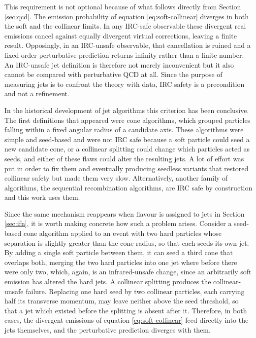 This requirement is not optional because of what follows directly from Section \ref{sec:qcd}.
The emission probability of equation \eqref{eq:soft-collinear}
diverges in both the soft and the collinear limits. In any IRC-safe observable
these divergent real emissions cancel against equally divergent virtual corrections,
leaving a finite result. Opposingly, in an IRC-unsafe observable, that cancellation
is ruined and a fixed-order perturbative prediction returns infinity rather than a
finite number. An IRC-unsafe jet definition is therefore not merely inconvenient but it also cannot
be compared with perturbative QCD at all. Since the purpose of measuring jets is to
confront the theory with data, IRC safety is a precondition and not a refinement.

In the historical development of jet algorithms this criterion has been conclusive.
The first definitions that appeared were cone algorithms, which grouped particles
falling within a fixed angular radius of a candidate axis. These algorithms were
simple and seed-based and were not IRC safe because a soft particle could seed a new
candidate cone, or a collinear splitting could change which particles acted as seeds, and
either of these flaws could alter the resulting jets. A lot of effort was put in order to
fix them and eventually producing seedless variants that restored collinear safety but made them very slow.
Alternatively, another family of algorithms, the sequential recombination algorithms,
are IRC safe by construction and this work uses them.

Since the same mechanism reappears when flavour is assigned to jets in Section \ref{sec:ifn},
it is worth making concrete how such a problem arises. Consider
a seed-based cone algorithm applied to an event with two hard particles whose
separation is slightly greater than the cone radius, so that each seeds its own
jet. By adding a single soft particle between them, it can seed a third cone 
that overlaps both, merging the two hard particles into one jet where before
there were only two, which, again, is an infrared-unsafe change,
since an arbitrarily soft emission has altered the hard jets.
A collinear splitting produces the collinear-unsafe failure.
Replacing one hard seed by two collinear particles, each
carrying half its transverse momentum, may leave neither above the seed threshold,
so that a jet which existed before the splitting is absent after it.
Therefore, in both cases, the divergent emissions of equation \eqref{eq:soft-collinear} 
feed directly into the
jets themselves, and the perturbative prediction diverges with them.


